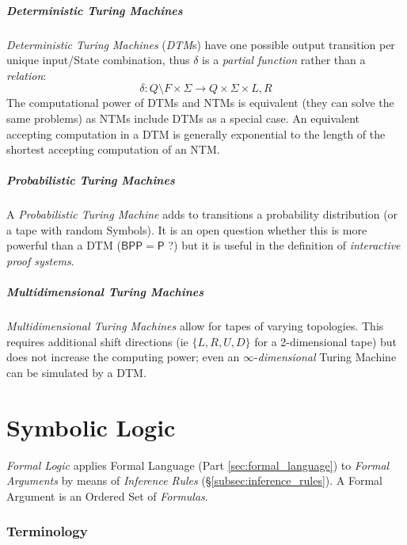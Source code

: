 \documentclass{article}
\begin{document}
\subsubsection{Deterministic Turing Machines}
\emph{Deterministic Turing Machines} (\emph{DTM}s) have one possible
output transition per unique input/State combination, thus $\delta$ is
a \emph{partial function} rather than a \emph{relation}:
\[
    \delta : Q \setminus F \times \Sigma \rightarrow Q \times
    \Sigma \times {L,R}
\]
The computational power of DTMs and NTMs is equivalent (they can solve
the same problems) as NTMs include DTMs as a special case. An
equivalent accepting computation in a DTM is generally exponential to
the length of the shortest accepting computation of an NTM.

\subsubsection{Probabilistic Turing Machines}
A \emph{Probabilistic Turing Machine} adds to transitions a
probability distribution (or a tape with random Symbols). It is an
open question whether this is more powerful than a DTM
($\mathsf{BPP}=\mathsf{P}$ ?)  but it is useful in the definition of
\emph{interactive proof systems}. %

\subsubsection{Multidimensional Turing Machines}
\emph{Multidimensional Turing Machines} allow for tapes of varying
topologies. This requires additional shift directions (ie $\{L, R, U,
D\}$ for a 2-dimensional tape) but does not increase the computing
power; even an $\infty$-\emph{dimensional} Turing Machine can be
simulated by a DTM.

\part{Symbolic Logic}

\emph{Formal Logic} applies Formal Language (Part
\ref{sec:formal_language}) to \emph{Formal Arguments} by means of
\emph{Inference Rules} (\S\ref{subsec:inference_rules}). A Formal
Argument is an Ordered Set of \emph{Formulas}.

\section{Terminology}\label{sec:logic_terminology}
\end{document}
